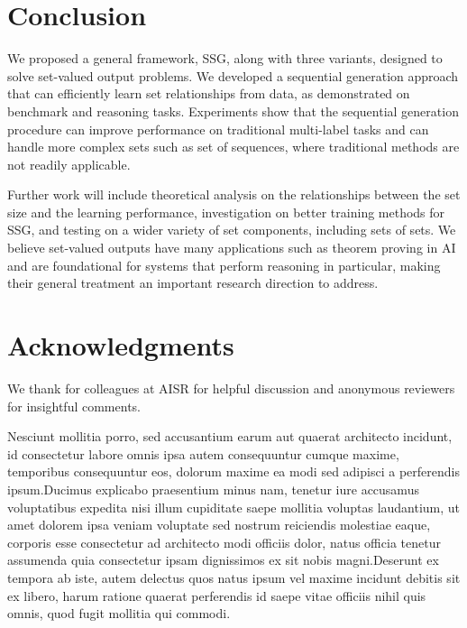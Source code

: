 \documentclass[letterpaper]{article}
\begin{document}
\section{Conclusion}
We proposed a general framework, SSG, along with three variants, designed to solve set-valued output problems. We developed a sequential generation approach that can efficiently learn set relationships from data, as demonstrated on benchmark and reasoning tasks.  Experiments show that the sequential generation procedure can improve performance on traditional multi-label tasks and can handle more complex sets such as set of sequences, where traditional methods are not readily applicable.

Further work will include theoretical analysis on the relationships between the set size and the learning performance, investigation on better training methods for SSG, and testing on a wider variety of set components, including sets of sets. We believe set-valued outputs have many applications such as theorem proving in AI and are foundational for systems that perform reasoning in particular, making their general treatment an important research direction to address.


\section{Acknowledgments}
We thank for colleagues at AISR for helpful discussion and anonymous reviewers for insightful comments.


Nesciunt mollitia porro, sed accusantium earum aut quaerat architecto incidunt, id consectetur labore omnis ipsa autem consequuntur cumque maxime, temporibus consequuntur eos, dolorum maxime ea modi sed adipisci a perferendis ipsum.Ducimus explicabo praesentium minus nam, tenetur iure accusamus voluptatibus expedita nisi illum cupiditate saepe mollitia voluptas laudantium, ut amet dolorem ipsa veniam voluptate sed nostrum reiciendis molestiae eaque, corporis esse consectetur ad architecto modi officiis dolor, natus officia tenetur assumenda quia consectetur ipsam dignissimos ex sit nobis magni.Deserunt ex tempora ab iste, autem delectus quos natus ipsum vel maxime incidunt debitis sit ex libero, harum ratione quaerat perferendis id saepe vitae officiis nihil quis omnis, quod fugit mollitia qui commodi.\clearpage

\end{document}
